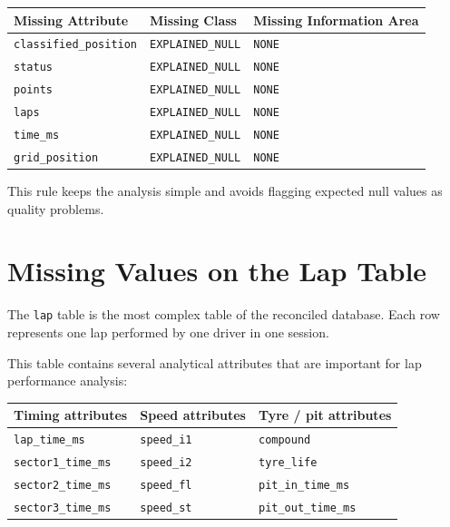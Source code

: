 \documentclass[a4paper,11pt]{article}
\begin{document}
	\begin{center}
		\begin{tabular}{lll}
			\toprule
			\textbf{Missing Attribute} & \textbf{Missing Class} & \textbf{Missing Information Area} \\
			\midrule
			\texttt{classified\_position} & \texttt{EXPLAINED\_NULL} & \texttt{NONE} \\
			\texttt{status} & \texttt{EXPLAINED\_NULL} & \texttt{NONE} \\
			\texttt{points} & \texttt{EXPLAINED\_NULL} & \texttt{NONE} \\
			\texttt{laps} & \texttt{EXPLAINED\_NULL} & \texttt{NONE}\\
			\texttt{time\_ms} & \texttt{EXPLAINED\_NULL} & \texttt{NONE} \\
			\texttt{grid\_position} & \texttt{EXPLAINED\_NULL} & \texttt{NONE} \\
			\bottomrule
		\end{tabular}
	\end{center}
	
	This rule keeps the analysis simple and avoids flagging expected null values as
	quality problems.
	

	\section{Missing Values on the Lap Table}
	
	The \texttt{lap} table is the most complex table of the reconciled database.
	Each row represents one lap performed by one driver in one session.
	
	This table contains several analytical attributes that are important for lap performance analysis:

	\begin{table}[H]
		\centering
		\small
		\begin{tabular}{p{4.2cm}p{4.2cm}p{4.2cm}}
			\toprule
			\textbf{Timing attributes} & \textbf{Speed attributes} & \textbf{Tyre / pit attributes} \\
			\midrule
			\texttt{lap\_time\_ms}     & \texttt{speed\_i1} & \texttt{compound} \\
			\texttt{sector1\_time\_ms} & \texttt{speed\_i2} & \texttt{tyre\_life} \\
			\texttt{sector2\_time\_ms} & \texttt{speed\_fl} & \texttt{pit\_in\_time\_ms} \\
			\texttt{sector3\_time\_ms} & \texttt{speed\_st} & \texttt{pit\_out\_time\_ms} \\
			\bottomrule
		\end{tabular}
	\end{table}
	
\end{document}

